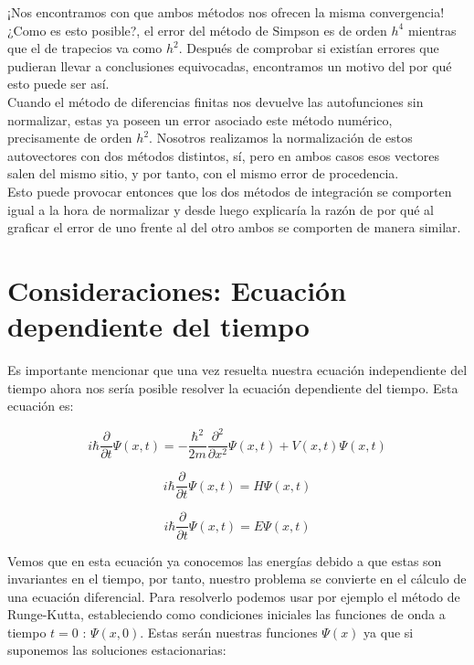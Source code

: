 \documentclass[12pt]{article}
\begin{document}
¡Nos encontramos con que ambos métodos nos ofrecen la misma convergencia! ¿Como es esto posible?, el error del método de Simpson es de orden $h^4$ mientras que el de trapecios va como $h^2$. Después de comprobar si existían errores que pudieran llevar a conclusiones equivocadas, encontramos un motivo del por qué esto puede ser así.\\

Cuando el método de diferencias finitas nos devuelve las autofunciones sin normalizar, estas ya poseen un error asociado  este método numérico, precisamente de orden $h^2$. Nosotros realizamos la normalización de estos autovectores con dos métodos distintos, sí, pero en ambos casos esos vectores salen del mismo sitio, y por tanto, con el mismo error de procedencia.\\

Esto puede provocar entonces que los dos métodos de integración se comporten igual a la hora de normalizar y desde luego explicaría la razón de por qué al graficar el error de uno frente al del otro ambos se comporten de manera similar.
    
\section{Consideraciones: Ecuación dependiente del tiempo}

Es importante mencionar que una vez resuelta nuestra ecuación independiente del tiempo ahora nos sería posible resolver la ecuación dependiente del tiempo. Esta ecuación es:

\begin{equation*}
    i\hbar \frac{\partial}{\partial t} \Psi(x, t) = -\frac{\hbar^2}{2m} \frac{\partial^2}{\partial x^2} \Psi(x, t) + V(x, t) \Psi(x, t)
\end{equation*}

\begin{equation*}
    i\hbar \frac{\partial}{\partial t} \Psi(x, t) = H \Psi(x, t)
\end{equation*}

\begin{equation}
    i\hbar \frac{\partial}{\partial t} \Psi(x, t) = E \Psi(x, t)
\end{equation}

Vemos que en esta ecuación ya conocemos las energías debido a que estas son invariantes en el tiempo, por tanto, nuestro problema se convierte en el cálculo de una ecuación diferencial.
Para resolverlo podemos usar por ejemplo el método de Runge-Kutta, estableciendo como condiciones iniciales las funciones de onda a tiempo $t=0$ : $\Psi(x,0)$. Estas serán nuestras funciones $\Psi(x)$ ya que si suponemos las soluciones estacionarias:
\end{document}
